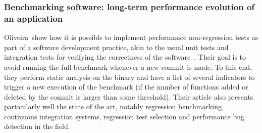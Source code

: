             \subsubsection{Benchmarking software: long-term performance evolution of an application}%

                Oliveira~\etal show how it is possible to implement performance non-regression tests as part of a
                software development practice, akin to the usual unit tests and integration tests for verifying the
                correctness of the software~\cite{De_Oliveira_2017}. Their goal is to avoid running the full benchmark
                whenever a new commit is made. To this end, they perform static analysis on the binary and have a list
                of several indicators to trigger a new execution of the benchmark (\eg if the number of functions
                added or deleted by the commit is larger than some threshold). Their article also presents particularly
                well the state of the art, notably regression benchmarking, continuous integration systems, regression
                test selection and performance bug detection in the field.

